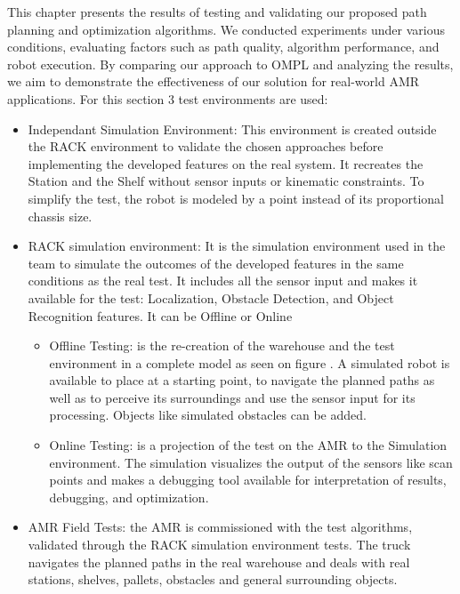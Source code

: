 This chapter presents the results of testing and validating our proposed path planning and optimization algorithms. 
We conducted experiments under various conditions, evaluating factors such as path quality, algorithm 
performance, and robot execution. By comparing our approach to OMPL and analyzing the results, we aim 
to demonstrate the effectiveness of our solution for real-world AMR applications.
For this section 3 test environments are used:
\begin{itemize}
    \item Independant Simulation Environment: This environment is created outside the RACK 
    environment to validate the chosen approaches before implementing the developed features 
    on the real system. It recreates the Station and the Shelf without sensor inputs or kinematic constraints.
    To simplify the test, the robot is modeled by a point instead of its proportional chassis size.

    \item RACK simulation environment: It is the simulation environment used in the team to simulate 
    the outcomes of the developed features in the same conditions as the real test. It includes all the sensor 
    input and makes it available for the test: Localization, Obstacle Detection, and Object Recognition features.
    It can be Offline or Online
    \begin{itemize}
        \item Offline Testing: is the re-creation of the warehouse and the test environment in a complete model
        as seen on figure . A simulated robot is available to place at a starting point, 
        to navigate the planned paths as well
        as to perceive its surroundings and use the sensor input for its processing. Objects like simulated 
        obstacles can be added. 
        \item Online Testing: is a projection of the test on the AMR to the Simulation environment.
        The simulation visualizes the output of the sensors like scan points and makes a debugging 
        tool available for interpretation of results, debugging, and optimization.
    \end{itemize}

    \item AMR Field Tests: the AMR is commissioned with the test algorithms, validated through the RACK simulation
    environment tests. The truck navigates the planned paths in the real warehouse and deals with real stations, 
    shelves, pallets, obstacles and general surrounding objects.
\end{itemize}

